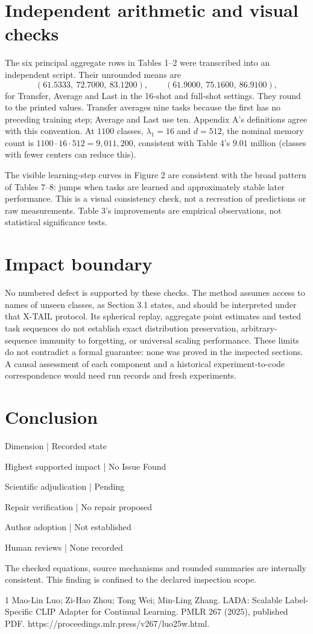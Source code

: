 \documentclass[10pt]{article}
\begin{document}
\section*{Independent arithmetic and visual checks}
The six principal aggregate rows in Tables 1–2 were transcribed into an independent script. Their unrounded means are \[(61.5333,\ 72.7000,\ 83.1200),\qquad
 (61.9000,\ 75.1600,\ 86.9100),\] for Transfer, Average and Last in the 16-shot and full-shot settings. They round to the printed values. Transfer averages nine tasks because the first has no preceding training step; Average and Last use ten. Appendix A’s definitions agree with this convention. At \(1100\) classes, \(\lambda_1=16\) and \(d=512\), the nominal memory count is \(1100\cdot16\cdot512=9{,}011{,}200\), consistent with Table 4’s \(9.01\) million (classes with fewer centers can reduce this).\par
The visible learning-step curves in Figure 2 are consistent with the broad pattern of Tables 7–8: jumps when tasks are learned and approximately stable later performance. This is a visual consistency check, not a recreation of predictions or raw measurements. Table 3’s improvements are empirical observations, not statistical significance tests.\par
\section*{Impact boundary}
No numbered defect is supported by these checks. The method assumes access to names of unseen classes, as Section 3.1 states, and should be interpreted under that X-TAIL protocol. Its spherical replay, aggregate point estimates and tested task sequences do not establish exact distribution preservation, arbitrary-sequence immunity to forgetting, or universal scaling performance. These limits do not contradict a formal guarantee: none was proved in the inspected sections. A causal assessment of each component and a historical experiment-to-code correspondence would need run records and fresh experiments.\par
\section*{Conclusion}
Dimension | Recorded state\par
Highest supported impact | No Issue Found\par
Scientific adjudication | Pending\par
Repair verification | No repair proposed\par
Author adoption | Not established\par
Human reviews | None recorded\par
The checked equations, source mechanisms and rounded summaries are internally consistent. This finding is confined to the declared inspection scope.\par
1 Mao-Lin Luo; Zi-Hao Zhou; Tong Wei; Min-Ling Zhang. LADA: Scalable Label-Specific CLIP Adapter for Continual Learning. PMLR 267 (2025), published PDF. https://proceedings.mlr.press/v267/luo25w.html.\par
\end{document}
